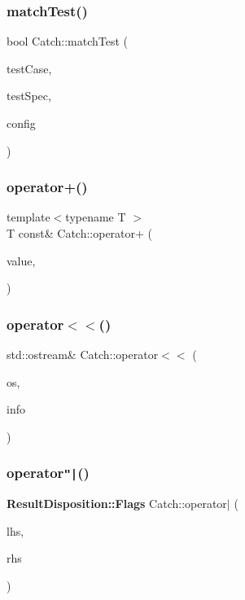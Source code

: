 \mbox{\label{namespace_catch_aadef80fbc6bc84589777a462770cef49}} 
\subsubsection{match\+Test()}
{\footnotesize\ttfamily bool Catch\+::match\+Test (\begin{DoxyParamCaption}\item[{\textbf{ Test\+Case} const \&}]{test\+Case,  }\item[{Test\+Spec const \&}]{test\+Spec,  }\item[{I\+Config const \&}]{config }\end{DoxyParamCaption})}

\mbox{\label{namespace_catch_a5e95b3c47a7618db3649dc39b0bb9004}} 
\subsubsection{operator+()}
{\footnotesize\ttfamily template$<$typename T $>$ \\
T const\& Catch\+::operator+ (\begin{DoxyParamCaption}\item[{T const \&}]{value,  }\item[{\textbf{ Stream\+End\+Stop}}]{ }\end{DoxyParamCaption})}

\mbox{\label{namespace_catch_a6ec18b5054d7fdfdde861c580b082995}} 
\subsubsection{operator$<$$<$()}
{\footnotesize\ttfamily std\+::ostream\& Catch\+::operator$<$$<$ (\begin{DoxyParamCaption}\item[{std\+::ostream \&}]{os,  }\item[{\textbf{ Source\+Line\+Info} const \&}]{info }\end{DoxyParamCaption})}

\mbox{\label{namespace_catch_ab32a083e442cc09f736327d2e2865999}} 
\subsubsection{operator\texttt{"|}()}
{\footnotesize\ttfamily \textbf{ Result\+Disposition\+::\+Flags} Catch\+::operator$\vert$ (\begin{DoxyParamCaption}\item[{\textbf{ Result\+Disposition\+::\+Flags}}]{lhs,  }\item[{\textbf{ Result\+Disposition\+::\+Flags}}]{rhs }\end{DoxyParamCaption})\hspace{0.3cm}{\ttfamily [inline]}}


